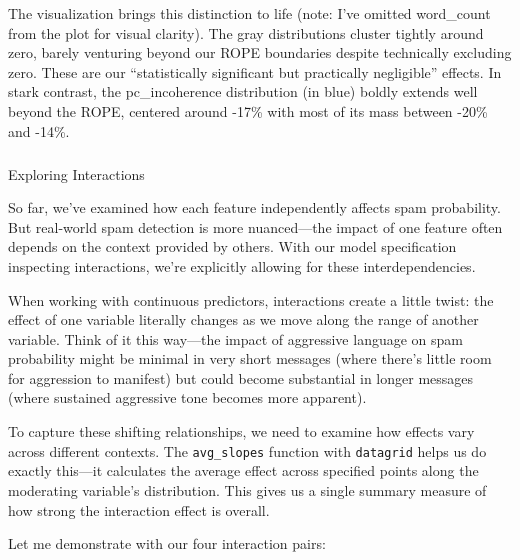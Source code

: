\documentclass[
  letterpaper,
  DIV=11,
  numbers=noendperiod]{scrartcl}
\makeatletter
\let\oldsubparagraph\subparagraph
\renewcommand{\subparagraph}{
    \@ifstar
      \xxxSubParagraphStar
      \xxxSubParagraphNoStar
  }
\newcommand{\xxxSubParagraphStar}[1]{\oldsubparagraph*{#1}\mbox{}}
\newcommand{\xxxSubParagraphNoStar}[1]{\oldsubparagraph{#1}\mbox{}}
\makeatother
\begin{document}
The visualization brings this distinction to life (note: I've omitted
word\_count from the plot for visual clarity). The gray distributions
cluster tightly around zero, barely venturing beyond our ROPE boundaries
despite technically excluding zero. These are our ``statistically
significant but practically negligible'' effects. In stark contrast, the
pc\_incoherence distribution (in blue) boldly extends well beyond the
ROPE, centered around -17\% with most of its mass between -20\% and
-14\%.

\subparagraph{Exploring Interactions}\label{exploring-interactions}

So far, we've examined how each feature independently affects spam
probability. But real-world spam detection is more nuanced---the impact
of one feature often depends on the context provided by others. With our
model specification inspecting interactions, we're explicitly allowing
for these interdependencies.

When working with continuous predictors, interactions create a little
twist: the effect of one variable literally changes as we move along the
range of another variable. Think of it this way---the impact of
aggressive language on spam probability might be minimal in very short
messages (where there's little room for aggression to manifest) but
could become substantial in longer messages (where sustained aggressive
tone becomes more apparent).

To capture these shifting relationships, we need to examine how effects
vary across different contexts. The \texttt{avg\_slopes} function with
\texttt{datagrid} helps us do exactly this---it calculates the average
effect across specified points along the moderating variable's
distribution. This gives us a single summary measure of how strong the
interaction effect is overall.

Let me demonstrate with our four interaction pairs:
\end{document}
